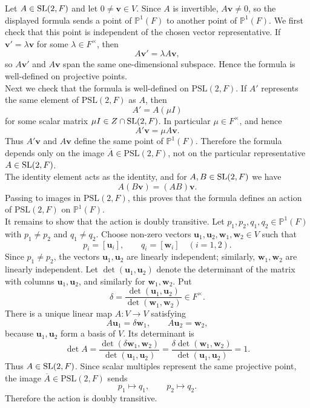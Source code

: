 \documentclass[../Odyssey_Project.tex]{subfiles}
\begin{document}
\begin{solution}
Let $A\in \operatorname{SL}(2,F)$ and let $0\neq \mathbf v\in V$. Since $A$ is invertible, $A\mathbf v\neq0$, so the displayed formula sends a point of $\mathbb P^1(F)$ to another point of $\mathbb P^1(F)$. We first check that this point is independent of the chosen vector representative. If $\mathbf v'=\lambda\mathbf v$ for some $\lambda\in F^\times$, then
\[
    A\mathbf v'=\lambda A\mathbf v,
\]
so $A\mathbf v'$ and $A\mathbf v$ span the same one-dimensional subspace. Hence the formula is well-defined on projective points.\\
Next we check that the formula is well-defined on $\mathrm{PSL}(2,F)$. If $A'$ represents the same element of $\mathrm{PSL}(2,F)$ as $A$, then
\[
    A'=A(\mu I)
\]
for some scalar matrix $\mu I\in Z\cap \operatorname{SL}(2,F)$. In particular $\mu\in F^\times$, and hence
\[
    A'\mathbf v=\mu A\mathbf v.
\]
Thus $A'\mathbf v$ and $A\mathbf v$ define the same point of $\mathbb P^1(F)$. Therefore the formula depends only on the image $\overline A\in\mathrm{PSL}(2,F)$, not on the particular representative $A\in\operatorname{SL}(2,F)$.\\
The identity element acts as the identity, and for $A,B\in\operatorname{SL}(2,F)$ we have
\[
    A(B\mathbf v)=(AB)\mathbf v.
\]
Passing to images in $\mathrm{PSL}(2,F)$, this proves that the formula defines an action of $\mathrm{PSL}(2,F)$ on $\mathbb P^1(F)$.\\
It remains to show that the action is doubly transitive. Let $p_1,p_2,q_1,q_2\in\mathbb P^1(F)$ with $p_1\neq p_2$ and $q_1\neq q_2$. Choose non-zero vectors $\mathbf u_1,\mathbf u_2,\mathbf w_1,\mathbf w_2\in V$ such that
\[
    p_i=[\mathbf u_i],
    \qquad
    q_i=[\mathbf w_i]
    \quad(i=1,2).
\]
Since $p_1\neq p_2$, the vectors $\mathbf u_1,\mathbf u_2$ are linearly independent; similarly, $\mathbf w_1,\mathbf w_2$ are linearly independent. Let $\det(\mathbf u_1,\mathbf u_2)$ denote the determinant of the matrix with columns $\mathbf u_1,\mathbf u_2$, and similarly for $\mathbf w_1,\mathbf w_2$. Put
\[
    \delta=\frac{\det(\mathbf u_1,\mathbf u_2)}{\det(\mathbf w_1,\mathbf w_2)}\in F^\times.
\]
There is a unique linear map $A\colon V\to V$ satisfying
\[
    A\mathbf u_1=\delta\mathbf w_1,
    \qquad
    A\mathbf u_2=\mathbf w_2,
\]
because $\mathbf u_1,\mathbf u_2$ form a basis of $V$. Its determinant is
\[
    \det A
    =
    \frac{\det(\delta\mathbf w_1,\mathbf w_2)}
         {\det(\mathbf u_1,\mathbf u_2)}
    =
    \frac{\delta\det(\mathbf w_1,\mathbf w_2)}
         {\det(\mathbf u_1,\mathbf u_2)}
    =
    1.
\]
Thus $A\in\operatorname{SL}(2,F)$. Since scalar multiples represent the same projective point, the image $\overline A\in\mathrm{PSL}(2,F)$ sends
\[
    p_1\mapsto q_1,
    \qquad
    p_2\mapsto q_2.
\]
Therefore the action is doubly transitive.
\end{solution}
\end{document}
